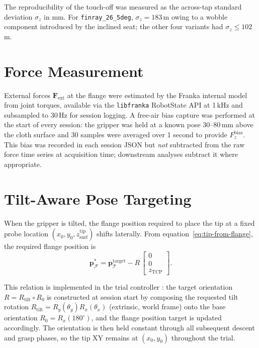 The reproducibility of the touch-off was measured as the across-tap standard
deviation $\sigma_z$ in mm. For \texttt{finray\_26\_5deg}, $\sigma_z =
183$\,\textmu m owing to a wobble component introduced by the inclined
seat; the other four variants had $\sigma_z \leq 102$\,\textmu m.

\section{Force Measurement}

External forces $\mathbf{F}_{\text{ext}}$ at the flange were estimated by the
Franka internal model from joint torques, available via the \texttt{libfranka}
RobotState API at 1\,kHz and subsampled to 30\,Hz for session logging.
A free-air bias capture was performed at the start of every session: the
gripper was held at a known pose 30--80\,mm above the cloth surface and
30 samples were averaged over 1 second to provide $F_z^{\text{bias}}$.
This bias was recorded in each session JSON but \emph{not} subtracted from
the raw force time series at acquisition time; downstream analyses subtract
it where appropriate.

\section{Tilt-Aware Pose Targeting}
\label{sec:tilt-pose}

When the gripper is tilted, the flange position required to place the tip at
a fixed probe location $(x_0, y_0, z_{\text{surf}}^{\text{tip}})$ shifts
laterally. From equation~\eqref{eq:tip-from-flange}, the required flange
position is
\begin{equation}
  \mathbf{p}_\mathcal{F}^{*} = \mathbf{p}_\mathcal{T}^{\text{target}} -
                              R\,\begin{bmatrix} 0 \\ 0 \\ z_{\text{TCP}} \end{bmatrix}.
  \label{eq:flange-target-tilted}
\end{equation}

This relation is implemented in the trial controller :
the target orientation $R = R_{\text{tilt}} \circ R_0$ is constructed at
session start by composing the requested tilt rotation
$R_{\text{tilt}} = R_y(\theta_y) R_x(\theta_x)$ (extrinsic, world frame)
onto the base orientation $R_0 = R_x(180^{\circ})$, and the flange position
target is updated accordingly. The orientation is then held constant
through all subsequent descent and grasp phases, so the tip XY remains at
$(x_0, y_0)$ throughout the trial.

